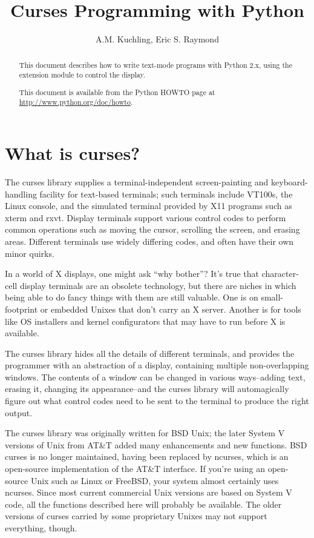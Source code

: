 \documentclass{howto}
\title{Curses Programming with Python}
\author{A.M. Kuchling, Eric S. Raymond}
\begin{document}
\maketitle

\begin{abstract}
\noindent
This document describes how to write text-mode programs with Python 2.x,
using the  extension module to control the display.   

This document is available from the Python HOWTO page at
\url{http://www.python.org/doc/howto}.
\end{abstract}

\tableofcontents

\section{What is curses?}

The curses library supplies a terminal-independent screen-painting and
keyboard-handling facility for text-based terminals; such terminals
include VT100s, the Linux console, and the simulated terminal provided
by X11 programs such as xterm and rxvt.  Display terminals support
various control codes to perform common operations such as moving the
cursor, scrolling the screen, and erasing areas.  Different terminals
use widely differing codes, and often have their own minor quirks.

In a world of X displays, one might ask ``why bother''?  It's true
that character-cell display terminals are an obsolete technology, but
there are niches in which being able to do fancy things with them are
still valuable.  One is on small-footprint or embedded Unixes that 
don't carry an X server.  Another is for tools like OS installers
and kernel configurators that may have to run before X is available.

The curses library hides all the details of different terminals, and
provides the programmer with an abstraction of a display, containing
multiple non-overlapping windows.  The contents of a window can be
changed in various ways--adding text, erasing it, changing its
appearance--and the curses library will automagically figure out what
control codes need to be sent to the terminal to produce the right
output.

The curses library was originally written for BSD Unix; the later System V
versions of Unix from AT\&T added many enhancements and new functions.
BSD curses is no longer maintained, having been replaced by ncurses,
which is an open-source implementation of the AT\&T interface.  If you're
using an open-source Unix such as Linux or FreeBSD, your system almost
certainly uses ncurses.  Since most current commercial Unix versions
are based on System V code, all the functions described here will
probably be available.  The older versions of curses carried by some
proprietary Unixes may not support everything, though.
\end{document}
